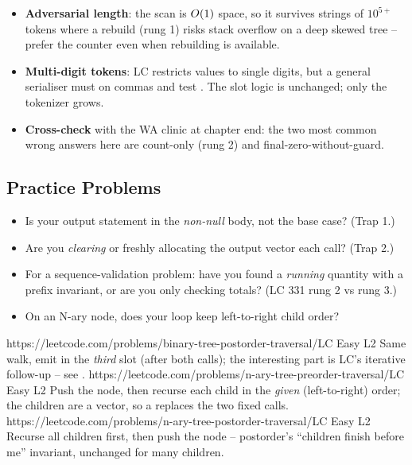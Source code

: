 \begin{hardeningbox}
\begin{itemize}[nosep, leftmargin=1.4em]
  \item \textbf{Adversarial length}: the scan is $O(1)$ space, so it survives strings
        of $10^{5+}$ tokens where a rebuild (rung 1) risks stack overflow on a deep
        skewed tree -- prefer the counter even when rebuilding is available.
  \item \textbf{Multi-digit tokens}: LC restricts values to single digits, but a general
        serialiser must  on commas and test . The slot
        logic is unchanged; only the tokenizer grows.
  \item \textbf{Cross-check} with the WA clinic at chapter end: the two most common
        wrong answers here are count-only (rung 2) and final-zero-without-guard.
\end{itemize}
\end{hardeningbox}

\subsection{Practice Problems}

\begin{stuckbox}
\begin{itemize}[nosep, leftmargin=1.4em]
  \item Is your output statement in the \emph{non-null} body, not the base case?
        (Trap 1.)
  \item Are you \emph{clearing} or freshly allocating the output vector each call?
        (Trap 2.)
  \item For a sequence-validation problem: have you found a \emph{running} quantity with
        a prefix invariant, or are you only checking totals? (LC 331 rung 2 vs rung 3.)
  \item On an N-ary node, does your loop keep left-to-right child order?
\end{itemize}
\end{stuckbox}

\begin{practiceset}
    {https://leetcode.com/problems/binary-tree-postorder-traversal/}{LC Easy L2}
    {Same walk, emit in the \emph{third} slot (after both calls); the interesting part is
    LC's iterative follow-up -- see .}
    {https://leetcode.com/problems/n-ary-tree-preorder-traversal/}{LC Easy L2}
    {Push the node, then recurse each child in the \emph{given} (left-to-right) order;
    the children are a vector, so a  replaces the two fixed calls.}
    {https://leetcode.com/problems/n-ary-tree-postorder-traversal/}{LC Easy L2}
    {Recurse all children first, then push the node -- postorder's ``children finish
    before me'' invariant, unchanged for many children.}
\end{practiceset}

